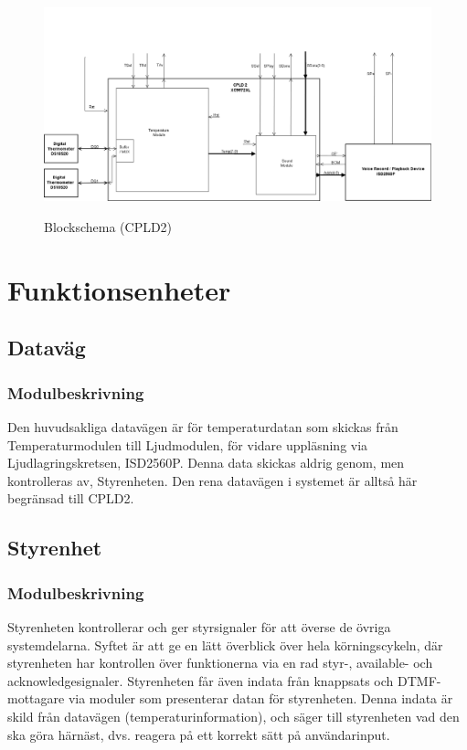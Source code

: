 \documentclass[a4paper,11pt]{article}
\begin{document}
	\begin{figure}[ht!]
	  \centering
	      \includegraphics[scale=0.48, angle=90]{BlockDiagramCPLD2.png}
		\label{fig:BlockDiagram2}
	  	\caption{Blockschema (CPLD2)}
	\end{figure}

\section{Funktionsenheter}

	\subsection{Dataväg}

	\subsubsection{Modulbeskrivning}

	Den huvudsakliga datavägen är för temperaturdatan som skickas från Temperaturmodulen till Ljudmodulen,
	för vidare uppläsning via Ljudlagringskretsen, ISD2560P. Denna data skickas aldrig genom, men kontrolleras av,
	Styrenheten. Den rena datavägen i systemet är alltså här begränsad till CPLD2.

	\subsection{Styrenhet}

	\subsubsection{Modulbeskrivning}

	Styrenheten kontrollerar och ger styrsignaler för att överse de övriga systemdelarna. Syftet är att ge en
	lätt överblick över hela körningscykeln, där styrenheten har kontrollen över funktionerna via en rad styr-,
	available- och acknowledgesignaler. Styrenheten får även indata från knappsats och DTMF-mottagare via moduler
	som presenterar datan för styrenheten. Denna indata är skild från datavägen (temperaturinformation), och säger
	till styrenheten vad den ska göra härnäst, dvs. reagera på ett korrekt sätt på användarinput.
\end{document}
